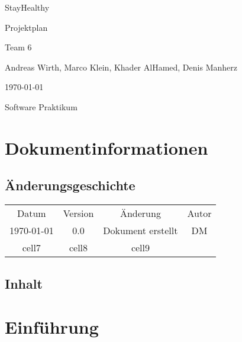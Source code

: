 \documentclass[12pt,a4paper,onecolumn]{article}
\newcommand\titleofdoc{StayHealthy} %
\newcommand\GroupName{Team 6} %
\begin{document}
\begin{titlepage}
   \begin{center}
        \vspace*{4cm} %

        \Huge{\titleofdoc} 

        \vspace{0.5cm}
        \LARGE{Projektplan}
            
        \vspace{3 cm}
        \Large{\GroupName}
       
        \vspace{0.25cm}
        \large{Andreas Wirth, Marco Klein, Khader AlHamed, Denis Manherz}
       
        \vspace{3 cm}
        \Large{\today}%
        
        \vspace{0.25 cm}
        \Large{Software Praktikum}
       

       \vfill
    \end{center}
\end{titlepage}
\setcounter{page}{2}
\tableofcontents
\newpage

\section{Dokumentinformationen} 
\subsection{Änderungsgeschichte}
\begin{center}
\begin{tabular}{ |c|c|c|c| } 
 \hline
 Datum & Version & Änderung & Autor\\ 
 \today & 0.0 & Dokument erstellt & DM \\ 
 cell7 & cell8 & cell9 \\ 
 \hline
\end{tabular}
\end{center}
\subsection{Inhalt}

\section{Einführung}
\end{document}
